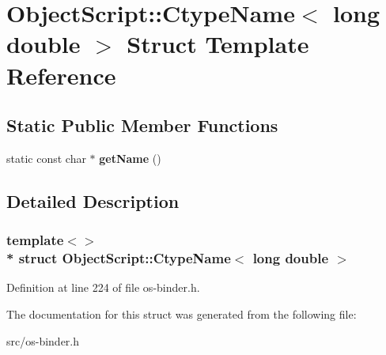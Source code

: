 \hypertarget{struct_object_script_1_1_ctype_name_3_01long_01double_01_4}{}\section{Object\+Script\+:\+:Ctype\+Name$<$ long double $>$ Struct Template Reference}
\label{struct_object_script_1_1_ctype_name_3_01long_01double_01_4}
\subsection*{Static Public Member Functions}
\begin{DoxyCompactItemize}
\item 
static const char $\ast$ {\bfseries get\+Name} ()\hypertarget{struct_object_script_1_1_ctype_name_3_01long_01double_01_4_aedc92eafc64af0e8e43bc0cb17e6a4a2}{}\label{struct_object_script_1_1_ctype_name_3_01long_01double_01_4_aedc92eafc64af0e8e43bc0cb17e6a4a2}

\end{DoxyCompactItemize}


\subsection{Detailed Description}
\subsubsection*{template$<$$>$\\*
struct Object\+Script\+::\+Ctype\+Name$<$ long double $>$}



Definition at line 224 of file os-\/binder.\+h.



The documentation for this struct was generated from the following file\+:\begin{DoxyCompactItemize}
\item 
src/os-\/binder.\+h\end{DoxyCompactItemize}

